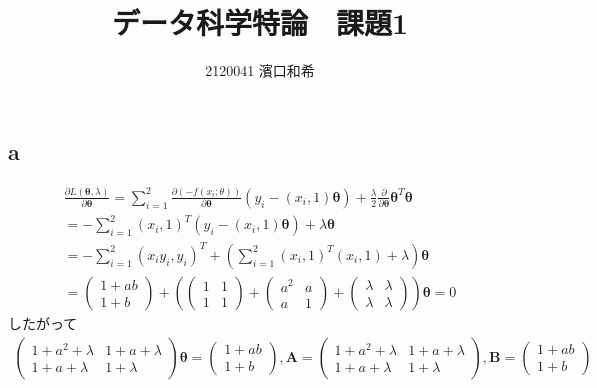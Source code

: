 \documentclass[uplatex,b5j]{jsarticle} %
\begin{document}
\title{データ科学特論　課題1}
\author{2120041 濱口和希}
\maketitle                      %

\section{}
\subsection{a}
\begin{eqnarray}
    \frac{\partial L(\boldsymbol{\theta}, \lambda)}{\partial \boldsymbol{\theta}} =
    \sum_{i=1}^{2}\frac{\partial (-f(x_i;\theta))}{\partial \boldsymbol{\theta}}(y_i-(x_i,1)\boldsymbol{\theta})
    +\frac{\lambda}{2}\frac{\partial}{\partial \boldsymbol{\theta}}\boldsymbol{\theta}^T \boldsymbol{\theta} \\ \nonumber
    = -\sum_{i=1}^{2}(x_i, 1)^T(y_i-(x_i,1)\boldsymbol{\theta})+\lambda\boldsymbol{\theta} \\ \nonumber
    = -\sum_{i=1}^{2}(x_iy_i, y_i)^T+(\sum_{i=1}^{2}(x_i,1)^T(x_i,1) + \lambda)\boldsymbol{\theta} \\ \nonumber
    = \left(\begin{array}{c} 1+ab \\ 1+b \end{array} \right) + \left(\left(\begin{array}{cc} 1&1 \\ 1&1 \end{array} \right)
    + \left(\begin{array}{cc} a^2&a \\ a&1 \end{array} \right) + \left(\begin{array}{cc} \lambda&\lambda \\ \lambda&\lambda \end{array} \right)\right)\boldsymbol{\theta} = 0
\end{eqnarray}
したがって
\begin{eqnarray}
    \left(\begin{array}{cc} 1+a^2+\lambda & 1+a+\lambda \\ 1+a+\lambda & 1+\lambda \end{array} \right)\boldsymbol{\theta} = \left(\begin{array}{c} 1+ab \\ 1+b \end{array} \right),
    \boldsymbol{A} = \left(\begin{array}{cc} 1+a^2+\lambda & 1+a+\lambda \\ 1+a+\lambda & 1+\lambda \end{array} \right),
    \boldsymbol{B} = \left(\begin{array}{c} 1+ab \\ 1+b \end{array} \right)
\end{eqnarray}
\end{document}
